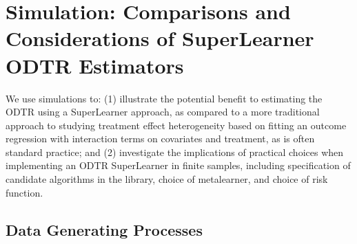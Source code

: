 \documentclass[a4paper,12pt]{article}
\begin{document}
\section{Simulation: Comparisons and Considerations of SuperLearner ODTR Estimators}

We use simulations to: (1) illustrate the potential benefit to estimating the ODTR using a SuperLearner approach, as compared to a more traditional approach to studying treatment effect heterogeneity based on fitting an outcome regression with interaction terms on covariates and treatment, as is often standard practice; and (2) investigate the implications of practical  choices when implementing an ODTR SuperLearner in finite samples, including specification of candidate algorithms in the library, choice of metalearner, and choice of risk function. 



\subsection{Data Generating Processes}
\end{document}
